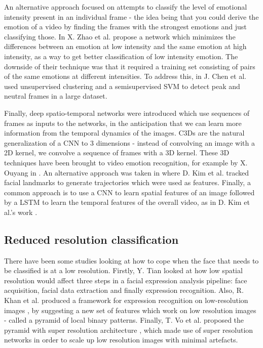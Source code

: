 \documentclass[sigconf]{acmart}
\begin{document}
{An alternative approach focused on attempts to classify the level of
emotional intensity present in an individual frame - the idea being that you
could derive the emotion of a video by finding the frames with the strongest
emotions and just classifying those. 
In \cite{zhao2016peak} X. Zhao et al. propose a network which minimizes the differences
between an emotion at low intensity and the same emotion at high intensity, as
a way to get better classification of low intensity emotion. The downside of
their technique was that it required a training set consisting of pairs of the
same emotions at different intensities. To address this, 
in \cite{chen2018deep} J. Chen et al. used unsupervised clustering and a semisupervised 
SVM to detect peak and neutral frames in a large dataset.

Finally, deep spatio-temporal networks were introduced which use sequences of
frames as inputs to the networks, in the anticipation that we can learn more
information from the temporal dynamics of the images. C3Ds
\cite{tran2015learning} are the natural generalization of a CNN to 3
dimensions - instead of convolving an image with a 2D kernel, we convolve a
sequence of frames with a 3D kernel. These 3D techniques have been brought to
video emotion recognition, for example by X. Ouyang in \cite{ouyang2017audio}.
An alternative approach was taken in \cite{kim2017multi} where D. Kim et al.
tracked facial landmarks to generate trajectories which were used as features.
Finally, a common approach is to use a CNN to learn spatial features of an
image followed by a LSTM to learn the temporal features of the overall video,
as in D. Kim et al.'s work \cite{kim2017multiobjective}.

\subsection{Reduced resolution classification}

There have been some studies looking at how to cope when the face that
needs to be classified is at a low resolution. Firstly, Y. Tian
\cite{tian2004evaluation} looked at how low spatial resolution would affect
three steps in a facial expression analysis pipeline: face acquisition,
facial data extraction and finally expression recognition. Also, R. Khan et
al. produced a framework for expression recognition on low-resolution images
\cite{khan2013framework}, by suggesting a new set of features which work on
low resolution images - called a pyramid of local binary patterns. Finally, T.
Vo et al. proposed the pyramid with super resolution architecture
\cite{vo2020pyramid}, which made use of super resolution networks in order to
scale up low resolution images with minimal artefacts. 



}
\end{document}
